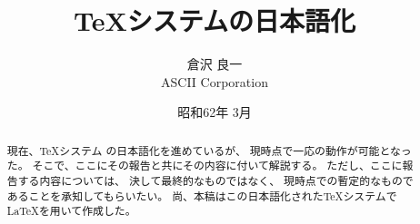 ﻿\newcommand{\cs}[1]{{$\backslash$#1}}
\addtolength{\textheight}{.5in}
\addtolength{\textwidth}{.7in}
\setlength{\oddsidemargin}{.4in}
\setlength{\evensidemargin}{.4in}
\title{\TeX システムの日本語化}
\author{倉沢 良一\\ASCII Corporation}
\date{昭和62年 3月}
\pagestyle{headings}

\maketitle
\begin{abstract}
現在、\TeX システム の日本語化を進めているが、
現時点で一応の動作が可能となった。
そこで、ここにその報告と共にその内容に付いて解説する。
ただし、ここに報告する内容については、
決して最終的なものではなく、
現時点での暫定的なものであることを承知してもらいたい。
尚、本稿はこの日本語化された\TeX システムで\LaTeX を用いて作成した。
\end{abstract}
%
\newpage
\tableofcontents
\newpage
%
